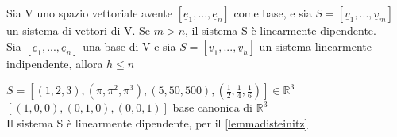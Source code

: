 \begin{lemma}[Steinitz]\label{lemmadisteinitz}
	Sia V uno spazio vettoriale avente $[\underline{e}_1,...,\underline{e}_n]$ come base, e sia $S=[\underline{v}_1,...,\underline{v}_m]$ un sistema di vettori di V. Se $m>n$, il sistema S è linearmente dipendente.\\
	Sia $[\underline{e}_1,...,\underline{e}_n]$ una base di V e sia $S=[\underline{v}_1,...,\underline{v}_h]$ un sistema linearmente indipendente, allora $h\leq n$
	\begin{es}
		$S=[(1,2,3),(\pi,\pi^2,\pi^3),(5,50,500),(\frac{1}{2},\frac{1}{4},\frac{1}{6})]\in\mathbb{R}^3$\\
		$[(1,0,0),(0,1,0),(0,0,1)]$ base canonica di $\mathbb{R}^3$\\
		Il sistema S è linearmente dipendente, per il \ref{lemmadisteinitz}
	\end{es}
\end{lemma}

